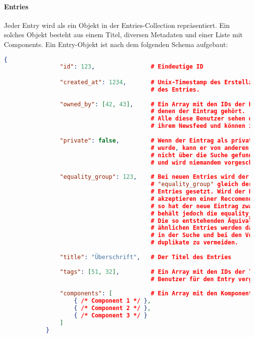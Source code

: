 	\paragraph{Entries} %
	\label{par:entries}
		
		Jeder Entry wird als ein Objekt in der Entries-Collection repräsentiert. Ein solches Objekt besteht aus einem Titel, diversen Metadaten und einer Liste mit Components. Ein Entry-Objekt ist nach dem folgenden Schema aufgebaut:

		\begin{lstlisting}[language=JSON]
			{
				"id": 123,                # Eindeutige ID

				"created_at": 1234,       # Unix-Timestamp des Erstellzeitpunktes 
				                          # des Entries.
				
				"owned_by": [42, 43],     # Ein Array mit den IDs der Benutzer,
				                          # denen der Eintrag gehört.
				                          # Alle diese Benutzer sehen den Eintrag in
				                          # ihrem Newsfeed und können ihn bearbeiten.
				
				"private": false,         # Wenn der Eintrag als privat markiert
				                          # wurde, kann er von anderen Benutzern 
				                          # nicht über die Suche gefunden werden
				                          # und wird niemandem vorgeschlagen.
				
				"equality_group": 123,    # Bei neuen Entries wird der Wert 
				                          # "equality_group" gleich der id des
				                          # Entries gesetzt. Wird der Entry beim
				                          # akzeptieren einer Reccomendation geklont,
				                          # so hat der neue Eintrag zwar eine neue id,
				                          # behält jedoch die equality_group.
				                          # Die so entstehenden Äquivalenzklassen an 
				                          # ähnlichen Entries werden dafür genutzt, 
				                          # in der Suche und bei den Vorschlägen
				                          # duplikate zu vermeiden.
				
				"title": "Überschrift",   # Der Titel des Entries
				
				"tags": [51, 32],         # Ein Array mit den IDs der Tags, die der 
				                          # Benutzer für den Entry vergeben hat.
				
				"components": [           # Ein Array mit den Komponenten des Entry
					{ /* Component 1 */ },
					{ /* Component 2 */ },
					{ /* Component 3 */ }
				]
			}
		\end{lstlisting}

